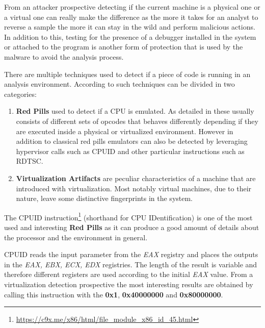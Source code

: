 From an attacker prospective detecting if the current machine is a physical one or a virtual one can really make the difference as the more it takes for an analyst to reverse a sample the more it can stay in the wild and perform malicious actions. In addition to this, testing for the presence of a debugger installed in the system or attached to the program is another form of protection that is used by the malware to avoid the analysis process.

There are multiple techniques used to detect if a piece of code is running in an analysis environment. According to \cite{9018111} such techniques can be divided in two categories:

\begin{enumerate}
    \item \textbf{Red Pills} used to detect if a CPU is emulated. As detailed in \cite{bruschi} these usually consists of different sets of opcodes that behaves differently depending if they are executed inside a physical or virtualized environment. However in addition to classical red pills emulators can also be detected by leveraging hypervisor calls such as CPUID and other particular instructions such as RDTSC.
    \item \textbf{Virtualization Artifacts} are peculiar characteristics of a machine that are introduced with virtualization. Most notably virtual machines, due to their nature, leave some distinctive fingerprints in the system.
\end{enumerate}

The CPUID instruction\footnote{\url{https://c9x.me/x86/html/file_module_x86_id_45.html}} (shorthand for CPU IDentification) is one of the most used and interesting \textbf{Red Pills} as it can produce a good amount of details about the processor and the environment in general.

CPUID reads the input parameter from the \textit{EAX} registry and places the outputs in the \textit{EAX, EBX, ECX, EDX} registries. The length of the result is variable and therefore different registers are used according to the initial \textit{EAX} value. From a virtualization detection prospective the most interesting results are obtained by calling this instruction with the \textbf{0x1}, \textbf{0x40000000} and \textbf{0x80000000}\cite{CPUID}. 

